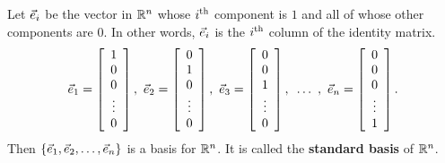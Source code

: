 \documentclass{ximera}
\begin{document}
\begin{exploration}

\begin{example}
  Let $\vect{e}_i$ be the vector in $\R^n$ whose $i\th$ component is $1$
  and all of whose other components are $0$. In other words, $\vect{e}_i$
  is the $i\th$ column of the identity matrix.
  \begin{equation*}
    \vect{e}_1 = \startmat{c} 1 \\ 0 \\ 0 \\ \vdots \\ 0 \stopmat,\quad
    \vect{e}_2 = \startmat{c} 0 \\ 1 \\ 0 \\ \vdots \\ 0 \stopmat,\quad
    \vect{e}_3 = \startmat{c} 0 \\ 0 \\ 1 \\ \vdots \\ 0 \stopmat,\quad
    \ldots~,\quad
    \vect{e}_n = \startmat{c} 0 \\ 0 \\ 0 \\ \vdots \\ 1\stopmat.
  \end{equation*}
  Then $\set{\vect{e}_1,\vect{e}_2,\ldots,\vect{e}_n}$ is a basis for
  $\R^n$. It is called the \textbf{standard basis}%
  of\/ $\R^n$.
\end{example}

\end{exploration}
\end{document}
